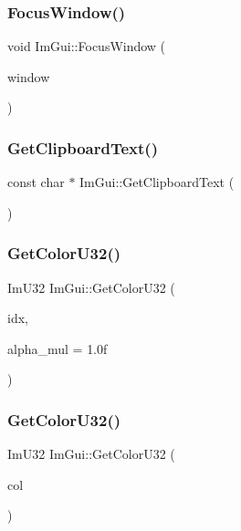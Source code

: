 \subsubsection{\texorpdfstring{Focus\+Window()}{FocusWindow()}}
{\footnotesize\ttfamily void Im\+Gui\+::\+Focus\+Window (\begin{DoxyParamCaption}\item[{\hyperlink{struct_im_gui_window}{Im\+Gui\+Window} $\ast$}]{window }\end{DoxyParamCaption})}

\hypertarget{namespace_im_gui_a11837daee819fd90e17d80ab1eef1f99}{}\label{namespace_im_gui_a11837daee819fd90e17d80ab1eef1f99} 
\subsubsection{\texorpdfstring{Get\+Clipboard\+Text()}{GetClipboardText()}}
{\footnotesize\ttfamily const char $\ast$ Im\+Gui\+::\+Get\+Clipboard\+Text (\begin{DoxyParamCaption}{ }\end{DoxyParamCaption})}

\hypertarget{namespace_im_gui_a0de2d9bd347d9866511eb8d014e62556}{}\label{namespace_im_gui_a0de2d9bd347d9866511eb8d014e62556} 
\subsubsection{\texorpdfstring{Get\+Color\+U32()}{GetColorU32()}\hspace{0.1cm}{\footnotesize\ttfamily [1/3]}}
{\footnotesize\ttfamily Im\+U32 Im\+Gui\+::\+Get\+Color\+U32 (\begin{DoxyParamCaption}\item[{Im\+Gui\+Col}]{idx,  }\item[{float}]{alpha\+\_\+mul = {\ttfamily 1.0f} }\end{DoxyParamCaption})}

\hypertarget{namespace_im_gui_ac701752365ddd58cecc1956fc62921a8}{}\label{namespace_im_gui_ac701752365ddd58cecc1956fc62921a8} 
\subsubsection{\texorpdfstring{Get\+Color\+U32()}{GetColorU32()}\hspace{0.1cm}{\footnotesize\ttfamily [2/3]}}
{\footnotesize\ttfamily Im\+U32 Im\+Gui\+::\+Get\+Color\+U32 (\begin{DoxyParamCaption}\item[{const \hyperlink{struct_im_vec4}{Im\+Vec4} \&}]{col }\end{DoxyParamCaption})}

